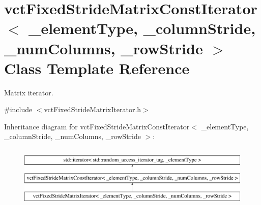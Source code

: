 \hypertarget{classvct_fixed_stride_matrix_const_iterator}{}\section{vct\+Fixed\+Stride\+Matrix\+Const\+Iterator$<$ \+\_\+element\+Type, \+\_\+column\+Stride, \+\_\+num\+Columns, \+\_\+row\+Stride $>$ Class Template Reference}
\label{classvct_fixed_stride_matrix_const_iterator}


Matrix iterator.  




{\ttfamily \#include $<$vct\+Fixed\+Stride\+Matrix\+Iterator.\+h$>$}

Inheritance diagram for vct\+Fixed\+Stride\+Matrix\+Const\+Iterator$<$ \+\_\+element\+Type, \+\_\+column\+Stride, \+\_\+num\+Columns, \+\_\+row\+Stride $>$\+:\begin{figure}[H]
\begin{center}
\leavevmode
\includegraphics[height=3.000000cm]{db/d74/classvct_fixed_stride_matrix_const_iterator}
\end{center}
\end{figure}
